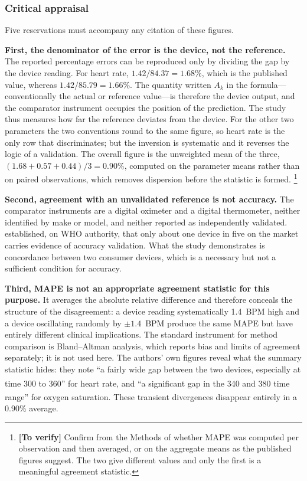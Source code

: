 \documentclass[12pt,a4paper,oneside]{report}
\newcommand{\verify}[1]{\footnote{\textbf{[To verify]} #1}}
\newcommand{\bq}[1]{``#1''\textsuperscript{\dag}}
\begin{document}
\subsubsection{Critical appraisal}\label{sec:efendi-appraisal}

Five reservations must accompany any citation of these figures.

\textbf{First, the denominator of the error is the device, not the reference.} The reported percentage errors can be reproduced only by dividing the gap by the device reading. For heart rate, $1.42/84.37 = 1.68\%$, which is the published value, whereas $1.42/85.79 = 1.66\%$. The quantity written $A_k$ in the formula---conventionally the actual or reference value---is therefore the device output, and the comparator instrument occupies the position of the prediction. The study thus measures how far the reference deviates from the device. For the other two parameters the two conventions round to the same figure, so heart rate is the only row that discriminates; but the inversion is systematic and it reverses the logic of a validation. The overall figure is the unweighted mean of the three, $(1.68+0.57+0.44)/3 = 0.90\%$, computed on the parameter means rather than on paired observations, which removes dispersion before the statistic is formed.%
\verify{Confirm from the Methods of \textcite{efendi2025} whether MAPE was computed per observation and then averaged, or on the aggregate means as the published figures suggest. The two give different values and only the first is a meaningful agreement statistic.}

\textbf{Second, agreement with an unvalidated reference is not accuracy.} The comparator instruments are a digital oximeter and a digital thermometer, neither identified by make or model, and neither reported as independently validated.  established, on WHO authority, that only about one device in five on the market carries evidence of accuracy validation. What the study demonstrates is concordance between two consumer devices, which is a necessary but not a sufficient condition for accuracy.

\textbf{Third, MAPE is not an appropriate agreement statistic for this purpose.} It averages the absolute relative difference and therefore conceals the structure of the disagreement: a device reading systematically 1.4~BPM high and a device oscillating randomly by $\pm 1.4$~BPM produce the same MAPE but have entirely different clinical implications. The standard instrument for method comparison is Bland--Altman analysis, which reports bias and limits of agreement separately; it is not used here. The authors' own figures reveal what the summary statistic hides: they note \bq{a fairly wide gap between the two devices, especially at time 300 to 360} for heart rate, and \bq{a significant gap in the 340 and 380 time range} for oxygen saturation. These transient divergences disappear entirely in a 0.90\% average.
\end{document}

